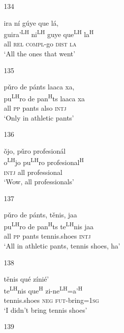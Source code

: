 \begin{itemize}
\item[134]
 
\glll   ira n\'{i} g\'{u}ye que l\'{a}, \\
  guira'\textsuperscript{LH} ni\textsuperscript{LH} guye que\textsuperscript{LH} la\textsuperscript{H}  \\
all \textsc{rel} \textsc{compl}-go \textsc{dist} \textsc{la} \\
\glt `All the ones that went'



\item[135]
 
\glll   p\v{u}ro de p\'{a}nts laaca xa,  \\ 
 pu\textsuperscript{LH}ro de pan\textsuperscript{H}ts laaca xa \\
all \textsc{pp} pants also \textsc{intj} \\
\glt `Only in athletic pants'




\item[136]
 
\glll   \v{o}jo, p\v{u}ro profesion\'{a}l \\
 o\textsuperscript{LH}jo pu\textsuperscript{LH}ro profesional\textsuperscript{H}  \\
\textsc{intj} all professional \\
\glt `Wow, all professionals'




\item[137]
 
\glll   p\v{u}ro de p\'{a}nts, t\v{e}nis, jaa \\
 pu\textsuperscript{LH}ro de pan\textsuperscript{H}ts te\textsuperscript{LH}nis jaa \\
  all \textsc{pp} pants tennis.shoes \textsc{intj} \\
\glt `All in athletic pants, tennis shoes, ha'
 


\item[138]
 
\glll   t\v{e}nis qu\'{e} z\'{i}ni\'{e}'  \\
 te\textsuperscript{LH}nis  que\textsuperscript{H} zi-ne\textsuperscript{LH}=a'\textsuperscript{H}  \\
tennis.shoes \textsc{neg} \textsc{fut}-bring=\textsc{1sg} \\
\glt `I didn't bring tennis shoes'
 


\item[139]
 

\end{itemize}
